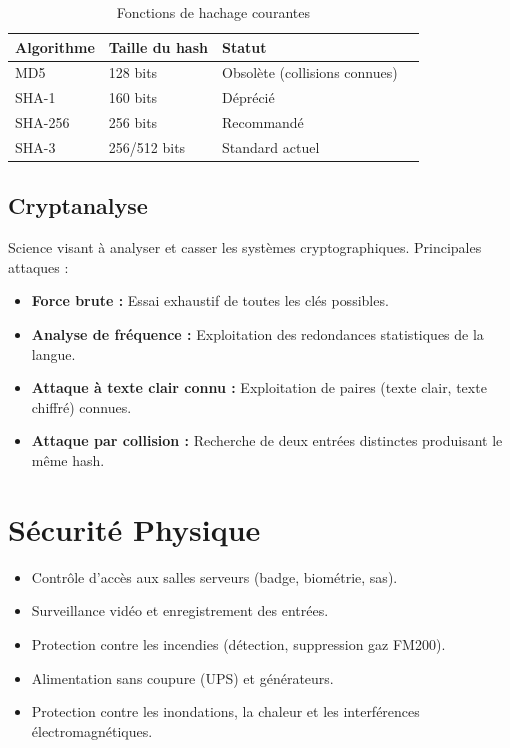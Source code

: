 \begin{table}[H]
\centering
\begin{tabular}{llll}
    \toprule
    \textbf{Algorithme} & \textbf{Taille du hash} & \textbf{Statut} \\
    \midrule
    MD5    & 128 bits & Obsolète (collisions connues) \\
    SHA-1  & 160 bits & Déprécié \\
    SHA-256 & 256 bits & Recommandé \\
    SHA-3  & 256/512 bits & Standard actuel \\
    \bottomrule
\end{tabular}
\caption{Fonctions de hachage courantes}
\end{table}

\subsection{Cryptanalyse}
Science visant à analyser et casser les systèmes cryptographiques. Principales attaques :
\begin{itemize}
    \item \textbf{Force brute :} Essai exhaustif de toutes les clés possibles.
    \item \textbf{Analyse de fréquence :} Exploitation des redondances statistiques de la langue.
    \item \textbf{Attaque à texte clair connu :} Exploitation de paires (texte clair, texte chiffré) connues.
    \item \textbf{Attaque par collision :} Recherche de deux entrées distinctes produisant le même hash.
\end{itemize}

\section{Sécurité Physique}
\begin{itemize}
    \item Contrôle d'accès aux salles serveurs (badge, biométrie, sas).
    \item Surveillance vidéo et enregistrement des entrées.
    \item Protection contre les incendies (détection, suppression gaz FM200).
    \item Alimentation sans coupure (UPS) et générateurs.
    \item Protection contre les inondations, la chaleur et les interférences électromagnétiques.
\end{itemize}

